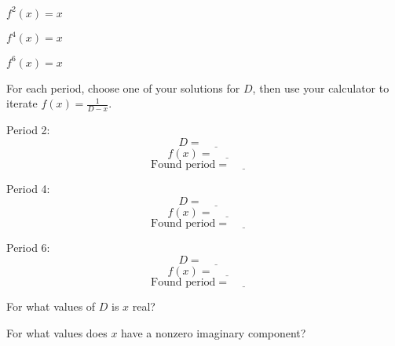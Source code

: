 \documentclass[../key.tex]{subfiles}
\begin{document}
\begin{inner_problem}[start=1]
\item $f^2(x)=x$
\end{inner_problem}

\begin{inner_problem}
\item $f^4(x)=x$
\end{inner_problem}

\begin{inner_problem}
\item $f^6(x)=x$
\end{inner_problem}

\begin{outer_problem}
\item For each period, choose one of your solutions for $D$, then use your calculator to iterate $f(x)=\frac{1}{D-x}$.
\end{outer_problem}

\begin{inner_problem}[start=1]
\item Period 2: $$D=\underline{\phantom{00000}}$$ $$f(x)=\underline{\phantom{00000}}$$ $$\text{Found period}=\underline{\phantom{00000}}$$
\end{inner_problem}

\begin{inner_problem}
\item Period 4: $$D=\underline{\phantom{00000}}$$ $$f(x)=\underline{\phantom{00000}}$$ $$\text{Found period}=\underline{\phantom{00000}}$$
\end{inner_problem}

\begin{inner_problem}
\item Period 6: $$D=\underline{\phantom{00000}}$$ $$f(x)=\underline{\phantom{00000}}$$ $$\text{Found period}=\underline{\phantom{00000}}$$
\end{inner_problem}

\begin{outer_problem}
\item
\end{outer_problem}

\begin{inner_problem}[start=1]
\item For what values of $D$ is $x$ real?
\end{inner_problem}

\begin{inner_problem}
\item For what values does $x$ have a nonzero imaginary component?
\end{inner_problem}
\end{document}
